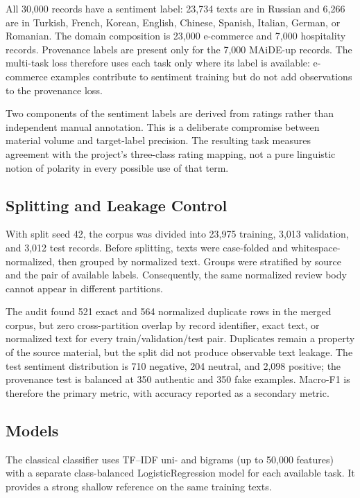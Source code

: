 \documentclass[11pt,a4paper]{article}
\begin{document}
All 30,000 records have a sentiment label: 23,734 texts are in Russian and 6,266 are in Turkish, French, Korean, English, Chinese, Spanish, Italian, German, or Romanian. The domain composition is 23,000 e-commerce and 7,000 hospitality records. Provenance labels are present only for the 7,000 MAiDE-up records. The multi-task loss therefore uses each task only where its label is available: e-commerce examples contribute to sentiment training but do not add observations to the provenance loss.

Two components of the sentiment labels are derived from ratings rather than independent manual annotation. This is a deliberate compromise between material volume and target-label precision. The resulting task measures agreement with the project's three-class rating mapping, not a pure linguistic notion of polarity in every possible use of that term.

\subsection{Splitting and Leakage Control}

With split seed 42, the corpus was divided into 23,975 training, 3,013 validation, and 3,012 test records. Before splitting, texts were case-folded and whitespace-normalized, then grouped by normalized text. Groups were stratified by source and the pair of available labels. Consequently, the same normalized review body cannot appear in different partitions.

The audit found 521 exact and 564 normalized duplicate rows in the merged corpus, but zero cross-partition overlap by record identifier, exact text, or normalized text for every train/validation/test pair. Duplicates remain a property of the source material, but the split did not produce observable text leakage. The test sentiment distribution is 710 negative, 204 neutral, and 2,098 positive; the provenance test is balanced at 350 authentic and 350 fake examples. Macro-F1 is therefore the primary metric, with accuracy reported as a secondary metric.

\subsection{Models}

The classical classifier uses TF--IDF uni- and bigrams (up to 50,000 features) with a separate class-balanced LogisticRegression model for each available task. It provides a strong shallow reference on the same training texts.
\end{document}
